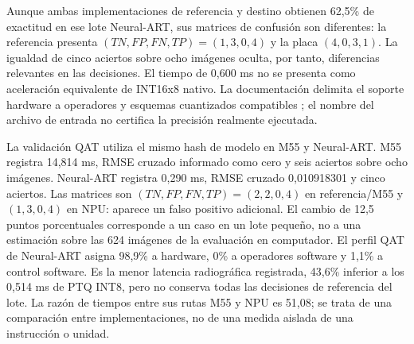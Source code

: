 Aunque ambas implementaciones de referencia y destino obtienen 62,5\% de exactitud en ese lote Neural-ART, sus matrices de confusión son diferentes: la referencia presenta $(TN,FP,FN,TP)=(1,3,0,4)$ y la placa $(4,0,3,1)$. La igualdad de cinco aciertos sobre ocho imágenes oculta, por tanto, diferencias relevantes en las decisiones. El tiempo de 0,600 ms no se presenta como aceleración equivalente de INT16x8 nativo. La documentación delimita el soporte hardware a operadores y esquemas cuantizados compatibles \cite{cap4_stoperators}; el nombre del archivo de entrada no certifica la precisión realmente ejecutada.


La validación QAT utiliza el mismo hash de modelo en M55 y Neural-ART. M55 registra 14,814 ms, RMSE cruzado informado como cero y seis aciertos sobre ocho imágenes. Neural-ART registra 0,290 ms, RMSE cruzado 0,010918301 y cinco aciertos. Las matrices son $(TN,FP,FN,TP)=(2,2,0,4)$ en referencia/M55 y $(1,3,0,4)$ en NPU: aparece un falso positivo adicional. El cambio de 12,5 puntos porcentuales corresponde a un caso en un lote pequeño, no a una estimación sobre las 624 imágenes de la evaluación en computador.
El perfil QAT de Neural-ART asigna 98,9\% a hardware, 0\% a operadores software y 1,1\% a control software. Es la menor latencia radiográfica registrada, 43,6\% inferior a los 0,514 ms de PTQ INT8, pero no conserva todas las decisiones de referencia del lote. La razón de tiempos entre sus rutas M55 y NPU es 51,08; se trata de una comparación entre implementaciones, no de una medida aislada de una instrucción o unidad.

\FloatBarrier
